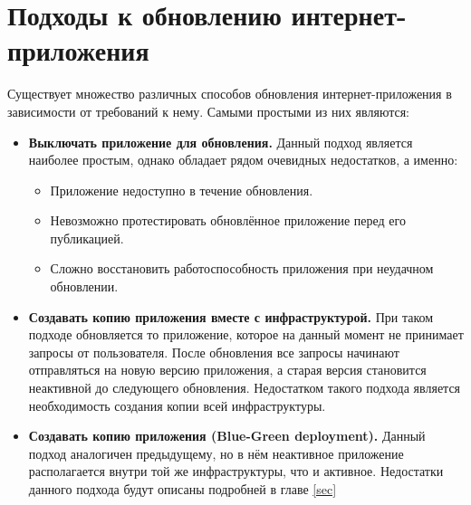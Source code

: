 \section{Подходы к обновлению интернет-приложения}
Существует множество различных способов обновления интернет-приложения в зависимости от требований к нему. Самыми простыми из них являются:
\begin{itemize}
	\item {\bf Выключать приложение для обновления.} Данный подход является наиболее простым, однако обладает рядом очевидных недостатков, а именно:
	\begin{itemize}
		\item Приложение недоступно в течение обновления.
		\item Невозможно протестировать обновлённое приложение перед его публикацией.
		\item Сложно восстановить работоспособность приложения при неудачном обновлении.
	\end{itemize}
	\item {\bf Создавать копию приложения вместе с инфраструктурой.} При таком подходе обновляется то приложение, которое на данный момент не принимает запросы от пользователя. После обновления все запросы начинают отправляться на новую версию приложения, а старая версия становится неактивной до следующего обновления. Недостатком такого подхода является необходимость создания копии всей инфраструктуры.
	\item {\bf Создавать копию приложения (Blue-Green deployment).} Данный подход аналогичен предыдущему, но в нём неактивное приложение располагается внутри той же инфраструктуры, что и активное. Недостатки данного подхода будут описаны подробней в главе \ref{sec}
\end{itemize}